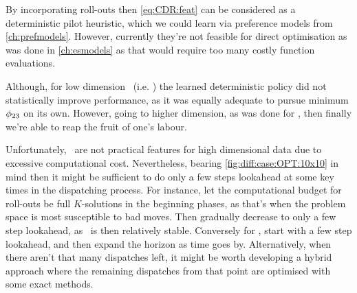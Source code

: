 By incorporating roll-outs then \cref{eq:CDR:feat} can be considered as a 
deterministic pilot heuristic, which we could learn via preference models from 
\cref{ch:prefmodels}. However, currently they're not feasible for direct 
optimisation as was done in \cref{ch:esmodels} as that would require too many 
costly function evaluations.

Although, for low dimension \jsp\ (i.e. \Problem[6\times5]{\train}) the learned 
deterministic policy did not statistically improve performance, as it was 
equally adequate to pursue minimum $\phi_{23}$ on its own.
However, going to higher dimension, as was done for , then finally 
we're able to reap the fruit of one's labour.

Unfortunately, \phiRNDRelated\ are not practical features for high dimensional 
data due to excessive computational cost. 
Nevertheless, bearing \cref{fig:diff:case:OPT:10x10} in mind then it 
might be sufficient to do only a few steps lookahead at some key times in the 
dispatching process. For instance, let the computational budget for 
 roll-outs be full $K$-solutions in the beginning phases, as 
that's when the problem space is most susceptible to bad moves. Then gradually 
decrease to only a few step lookahead, as \fsp\ is then relatively stable.
Conversely for , start with a few step lookahead, and then 
expand the horizon as time goes by. Alternatively, when there aren't that many 
dispatches left, it might be worth developing a hybrid approach where the 
remaining dispatches from that point are optimised with some exact methods. 
